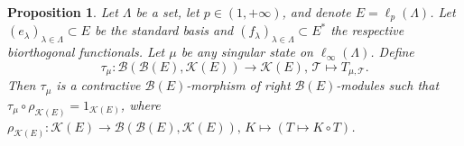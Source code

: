 \documentclass[12pt]{article}
\newtheorem{proposition}[theorem]{Proposition}
\begin{document}
\begin{proposition}\label{TauMapProps}
    Let $\Lambda$ be a set, let $p\in(1,+\infty)$, and 
    denote $E=\ell_p(\Lambda)$. Let $(e_\lambda)_{\lambda\in\Lambda}\subset E$ 
    be the standard basis and $(f_\lambda)_{\lambda\in\Lambda}\subset E^*$ the 
    respective biorthogonal functionals. Let $\mu$ be any 
    singular state on $\ell_\infty(\Lambda)$. Define
    \[
        \tau_{\mu}:
        \mathcal{B}(\mathcal{B}(E), \mathcal{K}(E))\to\mathcal{K}(E), \,
        \mathcal{T}\mapsto T_{\mu, \mathcal{T}}.
    \]
    Then $\tau_{\mu}$ is a contractive $\mathcal{B}(E)$-morphism of 
    right $\mathcal{B}(E)$-modules such 
    that $\tau_{\mu}\circ\rho_{\mathcal{K}(E)}=1_{\mathcal{K}(E)}$, 
    where 
    $
        \rho_{\mathcal{K}(E)}:
        \mathcal{K}(E)\to\mathcal{B}(\mathcal{B}(E), \mathcal{K}(E)), \,
        K\mapsto(T\mapsto K\circ T)
    $.
\end{proposition}
\end{document}

